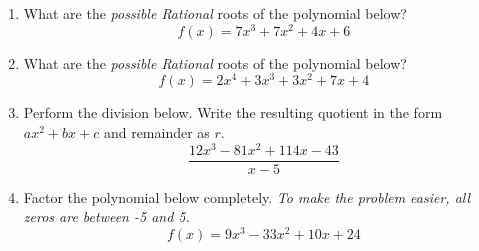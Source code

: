 \documentclass[14pt]{extbook}
\begin{document}
\begin{enumerate}
\item{
What are the \textit{possible Rational} roots of the polynomial below?\[ f(x) = 7x^{3} +7 x^{2} +4 x + 6 \]} \newpage
\item{
What are the \textit{possible Rational} roots of the polynomial below?\[ f(x) = 2x^{4} +3 x^{3} +3 x^{2} +7 x + 4 \]} \newpage
\item{
Perform the division below. Write the resulting quotient in the form $ax^2+bx+c$ and remainder as $r$.\[ \frac{12x^{3} -81 x^{2} +114 x -43}{x -5} \]} \newpage
\item{
Factor the polynomial below completely. \textit{To make the problem easier, all zeros are between -5 and 5.}\[ f(x) = 9x^{3} -33 x^{2} +10 x + 24 \]} \newpage
\end{enumerate}
\end{document}
